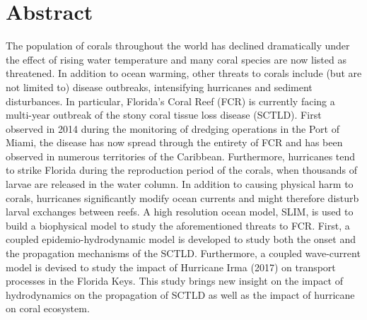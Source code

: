 
\chapter*{Abstract}

The population of corals throughout the world has declined dramatically under the effect of rising water temperature and many coral species are now listed as threatened. In addition to ocean warming, other threats to corals include (but are not limited to) disease outbreaks, intensifying hurricanes and sediment disturbances. In particular, Florida's Coral Reef (FCR) is currently facing a multi-year outbreak of the stony coral tissue loss disease (SCTLD). First observed in 2014 during the monitoring of dredging operations in the Port of Miami, the disease has now spread through the entirety of FCR and has been observed in numerous territories of the Caribbean. Furthermore, hurricanes tend to strike Florida during the reproduction period of the corals, when thousands of larvae are released in the water column. In addition to causing physical harm to corals, hurricanes significantly modify ocean currents and might therefore disturb larval exchanges between reefs. A high resolution ocean model, SLIM, is used to build a biophysical model to study the aforementioned threats to FCR. First, a coupled epidemio-hydrodynamic model is developed to study both the onset and the propagation mechanisms of the SCTLD. Furthermore, a coupled wave-current model is devised to study the impact of Hurricane Irma (2017) on transport processes in the Florida Keys. This study brings new insight on the impact of hydrodynamics on the propagation of SCTLD as well as the impact of hurricane on coral ecosystem.




